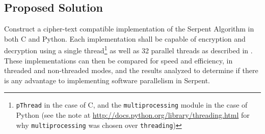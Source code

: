 \subsection{Proposed Solution}

Construct a cipher-text compatible implementation of the Serpent Algorithm in both C and Python. Each implementation shall be capable of encryption and decryption using a single thread\footnote{\texttt{pThread} in the case of C, and the \texttt{multiprocessing} module in the case of Python (see the note at \url{http://docs.python.org/library/threading.html} for why \texttt{multiprocessing} was chosen over \texttt{threading})} as well as 32 parallel threads as described in \cite{submission}. These implementations can then be compared for speed and efficiency, in threaded and non-threaded modes, and the results analyzed to determine if there is any advantage to implementing software parallelism in Serpent.

